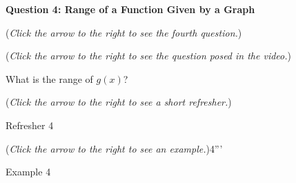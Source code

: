 \documentclass{ximera}
\begin{document}
\textbf{Question 4: Range of a Function Given by a Graph}
\begin{question}
\begin{flushright}
{\color{blue}(\emph{Click the arrow to the right to see the fourth question.})}
\end{flushright}
\begin{center}
\begin{expandable}
{\color{blue}(\emph{Click the arrow to the right to see the question
posed in the video.})}
\begin{expandable}
What is the range of $g(x)$?
\begin{multipleChoice}
\choice{$[-1,1)\cup(1,3]\cup[4,6]$}
\choice{$[-1,3]\cup[4,6]$}
\choice[correct]{$\{2\} \cup [6,15)$}
\choice{$\{2\}\cup [9,15)$}
\choice{$\{2\} \cup [6,9)$}
\end{multipleChoice}
\begin{flushright}
{\color{blue}(\emph{Click the arrow to the right to see a short refresher.})}
\end{flushright}
\begin{expandable}
Refresher 4
\end{expandable}
\begin{flushright}
{\color{blue}(\emph{Click the arrow to the right to see an example.})}4'''
\end{flushright}
\begin{expandable}
Example 4
\end{expandable}
\end{expandable}
\end{expandable}
\end{center}
\end{question}
\end{document}
